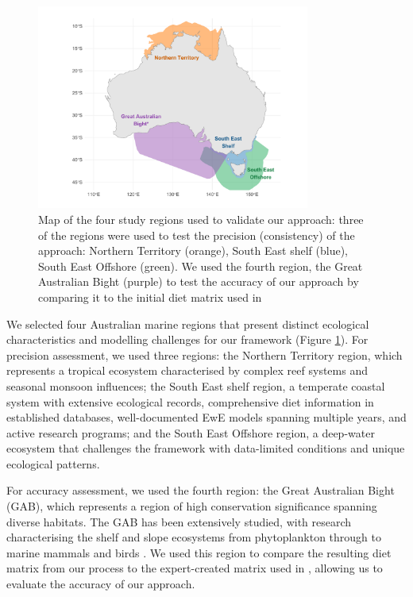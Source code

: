 \begin{figure}[htbp]
    \centering
    \includegraphics[width=0.8\textwidth]{figures/validation_regions.pdf}
    \caption{Map of the four study regions used to validate our approach: three of the regions were used to test the precision (consistency) of the approach: Northern Territory (orange), South East shelf (blue), South East Offshore (green). We used the fourth region, the Great Australian Bight (purple) to test the accuracy of our approach by comparing it to the initial diet matrix used in \citep{Fulton2018}}
    \label{fig:validation_regions}
    \end{figure}

We selected four Australian marine regions that present distinct ecological characteristics and modelling challenges for our framework (Figure \ref{fig:validation_regions}). For precision assessment, we used three regions: the Northern Territory region, which represents a tropical ecosystem characterised by complex reef systems and seasonal monsoon influences; the South East shelf region, a temperate coastal system with extensive ecological records, comprehensive diet information in established databases, well-documented EwE models spanning multiple years, and active research programs; and the South East Offshore region, a deep-water ecosystem that challenges the framework with data-limited conditions and unique ecological patterns.

For accuracy assessment, we used the fourth region: the Great Australian Bight (GAB), which represents a region of high conservation significance spanning diverse habitats. The GAB has been extensively studied, with research characterising the shelf and slope ecosystems from phytoplankton through to marine mammals and birds \citep{goldsworthy2013trophodynamics, Fulton2018}. We used this region to compare the resulting diet matrix from our process to the expert-created matrix used in \citep{Fulton2018}, allowing us to evaluate the accuracy of our approach.

